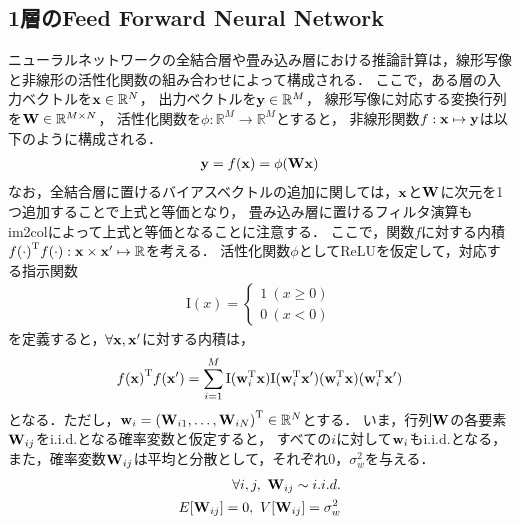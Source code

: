 \documentclass[11pt,a4j]{article}
\begin{document}
    \subsection{1層のFeed Forward Neural Network}
      ニューラルネットワークの全結合層や畳み込み層における推論計算は，線形写像と非線形の活性化関数の組み合わせによって構成される．
      ここで，ある層の入力ベクトルを${\bf x} \in \mathbb{R}^{N}$，
      出力ベクトルを${\bf y} \in \mathbb{R}^{M}$，
      線形写像に対応する変換行列を${\bf W} \in \mathbb{R}^{M \times N}$，
      活性化関数を$\phi: \mathbb{R}^{M} \to \mathbb{R}^{M}$とすると，
      非線形関数$f:{\bf x} \mapsto {\bf y}$は以下のように構成される．
      \begin{align}
        {\bf y} = f({\bf x}) = \phi( {\bf W x} )
      \end{align}
      なお，全結合層に置けるバイアスベクトルの追加に関しては，$\bf x$と$\bf W$に次元を1つ追加することで上式と等価となり，
      畳み込み層に置けるフィルタ演算もim2colによって上式と等価となることに注意する．
      ここで，関数$f$に対する内積${f(\cdot)}^{\mathrm{T}}f(\cdot): {\bf x} \times {\bf x}' \mapsto \mathbb{R}$を考える．
      活性化関数$\phi$としてReLUを仮定して，対応する指示関数
      \begin{align}
        {\mathrm{I}}(x) = 
        \begin{cases}
          1 ~ (x \geq 0) \\
          0 ~ (x < 0)
        \end{cases}
      \end{align}
      を定義すると，$\forall {\bf x},{\bf x}'$に対する内積は，
      \begin{align}
        {f({\bf x})}^{\mathrm{T}} f({\bf x}') = \sum_{i=1}^{M} 
        {\mathrm{I}}( {\bf w}_{i}^{\mathrm{T}} {\bf x} ) {\mathrm{I}}( {\bf w}_{i}^{\mathrm{T}} {\bf x}' ) 
        ( {\bf w}_{i}^{\mathrm{T}} {\bf x} ) ( {\bf w}_{i}^{\mathrm{T}} {\bf x}' )
      \end{align}
      となる．ただし，${\bf w}_i = {( {\bf W}_{i1},\dots,{\bf W}_{iN} )}^{\mathrm{T}} \in \mathbb{R}^{N}$とする．
      いま，行列$\bf W$の各要素${\bf W}_{ij}$をi.i.d.となる確率変数と仮定すると，
      すべての$i$に対して${\bf w}_i$もi.i.d.となる，また，確率変数${\bf W}_{ij}$は平均と分散として，それぞれ$0$，$\sigma_w^2$を与える．
      \begin{align}
        \forall i,j, ~ {\bf W}_{ij} \sim i.i.d. \\
        E[{\bf W}_{ij}] = 0, ~ V[{\bf W}_{ij}] = \sigma_w^2
      \end{align}
\end{document}
